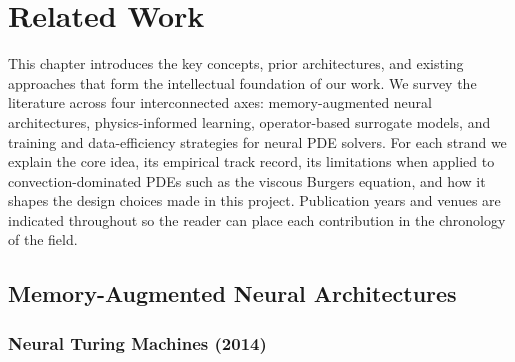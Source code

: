 \chapter{ Related Work}
\label{chap:related_work}

This chapter introduces the key concepts, prior architectures, and existing approaches that form the intellectual foundation of our work. We survey the literature across four interconnected axes: memory-augmented neural architectures, physics-informed learning, operator-based surrogate models, and training and data-efficiency strategies for neural PDE solvers. For each strand we explain the core idea, its empirical track record, its limitations when applied to convection-dominated PDEs such as the viscous Burgers equation, and how it shapes the design choices made in this project. Publication years and venues are indicated throughout so the reader can place each contribution in the chronology of the field.

\section{Memory-Augmented Neural Architectures}
\label{sec:bg:memory}

\subsection{Neural Turing Machines (2014)}
\label{sec:bg:ntm}

